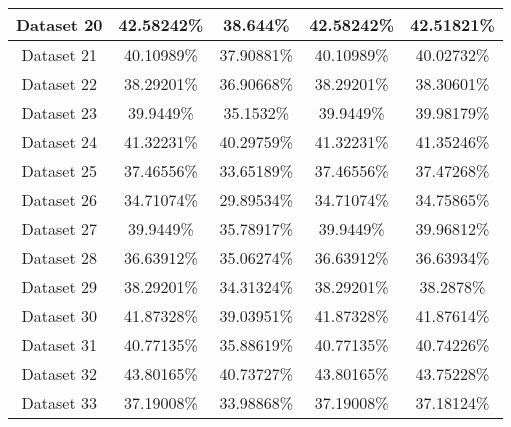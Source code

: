 \begin{table}
\begin{tabular}{ |c||c|c|c|c| }
    \hline
    Dataset 20&42.58242\%&38.644\%&42.58242\%&42.51821\%\\
    \hline
    Dataset 21&40.10989\%&37.90881\%&40.10989\%&40.02732\%\\
    \hline
    Dataset 22&38.29201\%&36.90668\%&38.29201\%&38.30601\%\\
    \hline
    Dataset 23&39.9449\%&35.1532\%&39.9449\%&39.98179\%\\
    \hline
    Dataset 24&41.32231\%&40.29759\%&41.32231\%&41.35246\%\\
    \hline
    Dataset 25&37.46556\%&33.65189\%&37.46556\%&37.47268\%\\
    \hline
    Dataset 26&34.71074\%&29.89534\%&34.71074\%&34.75865\%\\
    \hline
    Dataset 27&39.9449\%&35.78917\%&39.9449\%&39.96812\%\\
    \hline
    Dataset 28&36.63912\%&35.06274\%&36.63912\%&36.63934\%\\
    \hline
    Dataset 29&38.29201\%&34.31324\%&38.29201\%&38.2878\%\\
    \hline
    Dataset 30&41.87328\%&39.03951\%&41.87328\%&41.87614\%\\
    \hline
    Dataset 31&40.77135\%&35.88619\%&40.77135\%&40.74226\%\\
    \hline
    Dataset 32&43.80165\%&40.73727\%&43.80165\%&43.75228\%\\
    \hline
    Dataset 33&37.19008\%&33.98868\%&37.19008\%&37.18124\%\\
    \hline
\end{tabular}
\end{table}

\newpage

